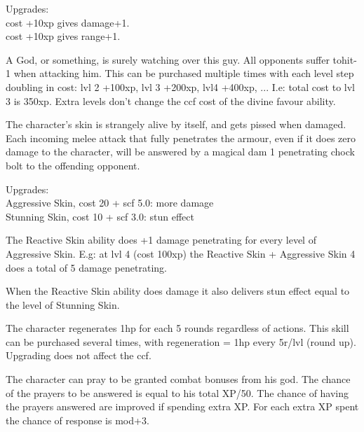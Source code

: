 Upgrades: \\
cost +10xp gives damage+1. \\
cost +10xp gives range+1.


 A God, or something, is surely watching over this guy. All opponents suffer tohit-1 when attacking him. This can be purchased multiple times with each level step doubling in cost: lvl 2 +100xp, lvl 3 +200xp, lvl4 +400xp, ... I.e: total cost to lvl 3 is 350xp. Extra levels don't change the ccf cost of the divine favour ability.


 The character's skin is strangely alive by itself, and gets pissed when damaged. Each incoming melee attack that fully penetrates the armour, even if it does zero damage to the character, will be answered by a magical dam 1 penetrating chock bolt to the offending opponent.

Upgrades: \\
Aggressive Skin, cost 20 + scf 5.0: more damage\\
Stunning Skin, cost 10 + scf 3.0: stun effect

 The Reactive Skin ability does +1 damage penetrating for every level of Aggressive Skin. E.g: at lvl 4 (cost 100xp) the Reactive Skin + Aggressive Skin 4 does a total of 5 damage penetrating.

 When the Reactive Skin ability does damage it also delivers stun effect equal to the level of Stunning Skin.


 The character regenerates 1hp for each 5 rounds regardless of actions. This skill can be purchased several times, with regeneration = 1hp every 5r/lvl (round up). Upgrading does not affect the ccf.


 The character can pray to be granted combat bonuses from his god. The chance of the prayers to be answered is equal to his total XP/50. The chance of having the prayers answered are improved if spending extra XP. For each extra XP spent the chance of response is mod+3.

